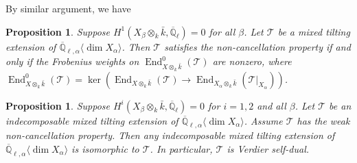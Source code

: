 \documentclass{amsart}
\theoremstyle{plain}
\newtheorem{prop}[subsubsection]{Proposition}
\theoremstyle{definition}
\theoremstyle{remark}
\numberwithin{equation}{subsection}
\begin{document}
By similar argument, we have

\begin{prop}\label{p:strong}
Suppose $H^1({{X_\beta}\otimes_k\bar{k}},{\overline{\mathbb{Q}}_{\ell}})=0$ for all $\beta$. Let ${\mathcal{T}}$ be a mixed tilting extension of ${\overline{\mathbb{Q}}_{\ell,\alpha}{\langle{{\dim X_\alpha}}\rangle}}$. Then ${\mathcal{T}}$ satisfies the non-cancellation property if and only if the Frobenius weights on $\operatorname{End}^0_{{{X}\otimes_k\bar{k}}}({\mathcal{T}})$ are nonzero, where $\operatorname{End}^0_{{{X}\otimes_k\bar{k}}}({\mathcal{T}})=\ker(\operatorname{End}_{{{X}\otimes_k\bar{k}}}({\mathcal{T}})\to\operatorname{End}_{{{X_\alpha}\otimes_k\bar{k}}}({\mathcal{T}}|_{X_\alpha}))$.
\end{prop}

\begin{prop}\label{p:can}
Suppose $H^i({{X_\beta}\otimes_k\bar{k}},{\overline{\mathbb{Q}}_{\ell}})=0$ for $i=1,2$ and all $\beta$. Let ${\mathcal{T}}$ be an indecomposable mixed tilting extension of ${\overline{\mathbb{Q}}_{\ell,\alpha}{\langle{{\dim X_\alpha}}\rangle}}$. Assume ${\mathcal{T}}$ has the weak non-cancellation property. Then any indecomposable mixed tilting extension of ${\overline{\mathbb{Q}}_{\ell,\alpha}{\langle{{\dim X_\alpha}}\rangle}}$ is isomorphic to ${\mathcal{T}}$. In particular, ${\mathcal{T}}$ is Verdier self-dual.
\end{prop}
\end{document}
